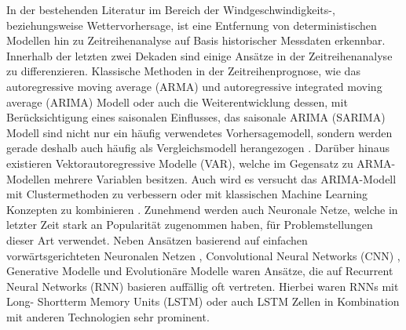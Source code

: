 \documentclass[
12pt, %
toc=listofnumbered, %
toc=chapterentrydotfill, %
numbers=noenddot, %
captions=tableheading, %
bibliography=numbered
]{scrreprt}
\begin{document}
In der bestehenden Literatur im Bereich der Windgeschwindigkeits-, beziehungsweise Wettervorhersage, ist eine Entfernung von 
deterministischen Modellen \cite{1963_Lorenz_DeterministicNonperiodicFlow} hin zu Zeitreihenanalyse auf Basis historischer Messdaten erkennbar. 
Innerhalb der letzten zwei Dekaden sind einige Ansätze in der Zeitreihenanalyse zu differenzieren. Klassische Methoden in der 
Zeitreihenprognose, wie das autoregressive moving average (ARMA) und autoregressive integrated moving average (ARIMA) Modell \cite{2016_Cadenas_WindSpeedPrediction} oder auch 
die Weiterentwicklung dessen, mit Berücksichtigung eines saisonalen Einflusses, das saisonale ARIMA (SARIMA) Modell \cite{2018_Alencar_HybridApproachCombining,2019_TenaGarcia_ForecastDailyOutput,2019_Haddad_WindSolarForecasting,2002_Igboekwe_StochasticSimulationHourly,2012_MuhammadSami_PredictionRateDust,
2010_Meng_ModelingForecastingHourly,
2020_Kreuzer_ShorttermTemperatureForecasts} sind 
nicht nur ein häufig verwendetes Vorhersagemodell, sondern werden gerade deshalb auch häufig als Vergleichsmodell herangezogen \cite{2012_Cao_ForecastingWindSpeed,2019_Chen_MultifactorSpatiotemporalCorrelation,2020_Kreuzer_ShorttermTemperatureForecasts}. Darüber hinaus existieren Vektorautoregressive Modelle (VAR)\cite{2014_Orpia_TimeSeriesAnalysis, 2007_Ewing_TimeSeriesAnalysis,2015_He_SparsifiedVectorAutoregressive,2016_Koivisto_WindSpeedModeling, 2015_Dowell_SpatiotemporalPredictionWind}, 
welche im Gegensatz zu ARMA-Modellen mehrere Variablen besitzen. Auch wird es versucht das ARIMA-Modell mit Clustermethoden 
zu verbessern oder mit klassischen Machine Learning Konzepten zu kombinieren \cite{2017_Zhang_HybridMethodShortTerm,2011_Guo_CorrectedHybridApproach}. 
Zunehmend werden auch Neuronale Netze, welche in letzter Zeit stark an Popularität zugenommen haben, für Problemstellungen dieser 
Art verwendet. Neben Ansätzen basierend auf einfachen vorwärtsgerichteten Neuronalen Netzen \cite{2019_Samet_EvaluationNeuralNetworkbased,2017_Chang_ImprovedNeuralNetworkbased}, Convolutional Neural Networks (CNN) \cite{2020_Zhao_ShorttermAverageWind,2019_Chen_MultifactorSpatiotemporalCorrelation},  
Generative Modelle \cite{2019_Khodayar_IntervalDeepGenerative} und Evolutionäre Modelle \cite{2012_Wang_ShorttermWindSpeed} 
waren Ansätze, die auf Recurrent Neural Networks (RNN) basieren auffällig oft vertreten. Hierbei waren RNNs mit Long- Shortterm Memory Units (LSTM) \cite{2018_Dong_WindPowerPrediction,2020_Delgado_WindTurbineData,2020_Moharm_WindSpeedForecast,2019_Prabha_WindSpeedForecasting,2019_Cali_ShorttermWindPower} oder auch LSTM Zellen in Kombination mit 
anderen Technologien \cite{2019_Chen_MultifactorSpatiotemporalCorrelation,2016_Allende_RecurrentNetworksWind,2018_Liu_WindSpeedForecasting,2018_Yao_MultidimensionalLSTMNetworks} sehr prominent.
\end{document}
